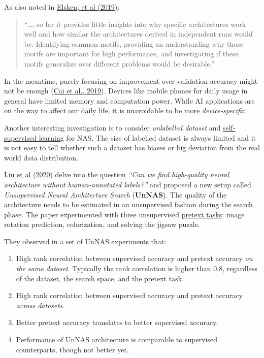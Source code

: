 As also noted in \href{https://arxiv.org/abs/1808.05377}{Elsken, et al (2019)}:

\begin{quote}
``\ldots, so far it provides little insights into why specific architectures work well and how similar the architectures derived in independent runs would be. Identifying common motifs, providing an understanding why those motifs are important for high performance, and investigating if these motifs generalize over different problems would be desirable.''
\end{quote}

In the meantime, purely focusing on improvement over validation accuracy might not be enough (\href{https://arxiv.org/abs/1812.00332}{Cai et al., 2019}). Devices like mobile phones for daily usage in general have limited memory and computation power. While AI applications are on the way to affect our daily life, it is unavoidable to be more \emph{device-specific}.

Another interesting investigation is to consider \emph{unlabelled dataset} and \href{https://lilianweng.github.io/posts/2019-11-10-self-supervised/}{self-supervised learning} for NAS. The size of labelled dataset is always limited and it is not easy to tell whether such a dataset has biases or big deviation from the real world data distribution.

\href{https://arxiv.org/abs/2003.12056}{Liu et al (2020)} delve into the question \emph{``Can we find high-quality neural architecture without human-annotated labels?''} and proposed a new setup called \emph{Unsupervised Neural Architecture Search} (\textbf{UnNAS}). The quality of the architecture needs to be estimated in an unsupervised fashion during the search phase. The paper experimented with three unsupervised \href{https://lilianweng.github.io/posts/2019-11-10-self-supervised/\#images-based}{pretext tasks}: image rotation prediction, colorization, and solving the jigsaw puzzle.

They observed in a set of UnNAS experiments that:

\begin{enumerate}
\tightlist
\item
  High rank correlation between supervised accuracy and pretext accuracy \emph{on the same dataset}. Typically the rank correlation is higher than 0.8, regardless of the dataset, the search space, and the pretext task.
\item
  High rank correlation between supervised accuracy and pretext accuracy \emph{across datasets}.
\item
  Better pretext accuracy translates to better supervised accuracy.
\item
  Performance of UnNAS architecture is comparable to supervised counterparts, though not better yet.
\end{enumerate}


